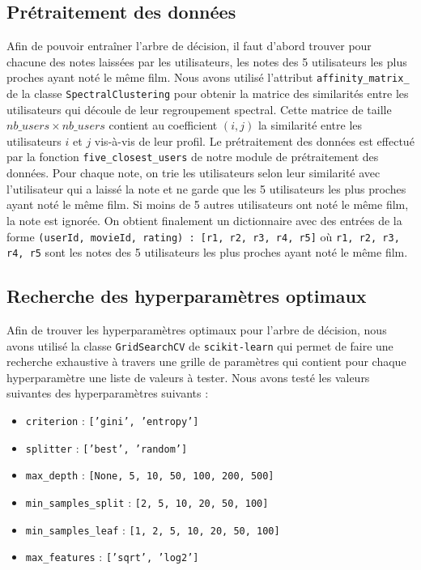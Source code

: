 \documentclass{article}
\begin{document}
\subsection{Prétraitement des données}
Afin de pouvoir entraîner l'arbre de décision, il faut d'abord trouver pour chacune
des notes laissées par les utilisateurs, les notes des 5 utilisateurs les plus
proches ayant noté le même film.
\vskip 0.25cm
Nous avons utilisé l'attribut \texttt{affinity\_matrix\_} de la classe
\texttt{SpectralClustering} pour obtenir la matrice
des similarités entre les utilisateurs qui découle de leur regroupement spectral.
Cette matrice de taille $nb\_users \times nb\_users$ contient au coefficient
$(i, j)$ la similarité entre les utilisateurs $i$ et $j$ vis-à-vis de leur profil.
\vskip 0.25cm
Le prétraitement des données est effectué par la fonction \texttt{five\_closest\_users}
de notre module de prétraitement des données. Pour chaque note, on trie les utilisateurs
selon leur similarité avec l'utilisateur qui a laissé la note et ne garde que les
5 utilisateurs les plus proches ayant noté le même film. Si moins de 5 autres utilisateurs
ont noté le même film, la note est ignorée.
\vskip 0.25cm
On obtient finalement un dictionnaire avec des entrées de la forme 
\texttt{(userId, movieId, rating) : [r1, r2, r3, r4, r5]} où \texttt{r1, r2, r3, r4, r5}
sont les notes des 5 utilisateurs les plus proches ayant noté le même film.

\subsection{Recherche des hyperparamètres optimaux}
Afin de trouver les hyperparamètres optimaux pour l'arbre de décision, nous avons
utilisé la classe \texttt{GridSearchCV} de \texttt{scikit-learn} qui permet
de faire une recherche exhaustive à travers une grille de paramètres qui
contient pour chaque hyperparamètre une liste de valeurs à tester.
\vskip 0.25cm
\noindent Nous avons testé les valeurs suivantes des hyperparamètres suivants :

\begin{itemize}
  \item \texttt{criterion} : \texttt{['gini', 'entropy']}
  \item \texttt{splitter} : \texttt{['best', 'random']}
  \item \texttt{max\_depth} : \texttt{[None, 5, 10, 50, 100, 200, 500]}
  \item \texttt{min\_samples\_split} : \texttt{[2, 5, 10, 20, 50, 100]}
  \item \texttt{min\_samples\_leaf} : \texttt{[1, 2, 5, 10, 20, 50, 100]}
  \item \texttt{max\_features} : \texttt{['sqrt', 'log2']}
\end{itemize}
\end{document}
